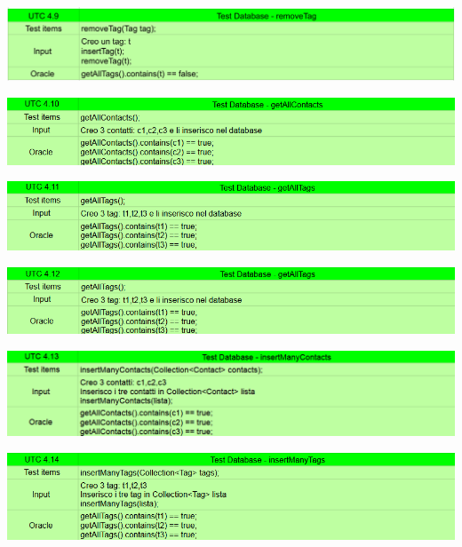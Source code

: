 \begin{center} \includegraphics[width=\linewidth]{images/UTC/4.9.png} \end{center}
\begin{center} \includegraphics[width=\linewidth]{images/UTC/4.10.png} \end{center}
\begin{center} \includegraphics[width=\linewidth]{images/UTC/4.11.png} \end{center}
\begin{center} \includegraphics[width=\linewidth]{images/UTC/4-12.png} \end{center}
\begin{center} \includegraphics[width=\linewidth]{images/UTC/4-13.png} \end{center}
\begin{center} \includegraphics[width=\linewidth]{images/UTC/4-14.png} \end{center}
